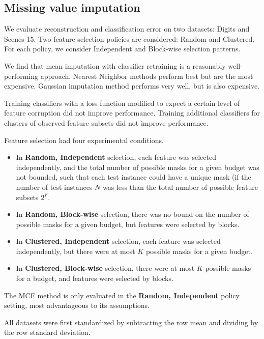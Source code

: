 \subsection{Missing value imputation}\label{sec:clf_eval_imputation}

We evaluate reconstruction and classification error on two datasets: Digits and Scenes-15.
Two feature selection policies are considered: Random and Clustered.
For each policy, we consider Independent and Block-wise selection patterns.

We find that mean imputation with classifier retraining is a reasonably well-performing approach.
Nearest Neighbor methods perform best but are the most expensive.
Gaussian imputation method performs very well, but is also expensive.

Training classifiers with a loss function modified to expect a certain level of feature corruption did not improve performance.
Training additional classifiers for clusters of observed feature subsets did not improve performance.

Feature selection had four experimental conditions.
\begin{itemize}
\item
In \textbf{Random, Independent} selection, each feature was selected independently, and the total number of possible masks for a given budget was not bounded, such that each test instance could have a unique mask (if the number of test instances $N$ was less than the total number of possible feature subsets $2^F$.

\item
In \textbf{Random, Block-wise} selection, there was no bound on the number of possible masks for a given budget, but features were selected by blocks.

\item
In \textbf{Clustered, Independent} selection, each feature was selected independently, but there were at most $K$ possible masks for a given budget.

\item
In \textbf{Clustered, Block-wise} selection, there were at most $K$ possible masks for a budget, and features were selected by blocks.
\end{itemize}

The MCF method is only evaluated in the \textbf{Random, Independent} policy setting, most advantageous to its assumptions.

All datasets were first standardized by subtracting the row mean and dividing by the row standard deviation.

